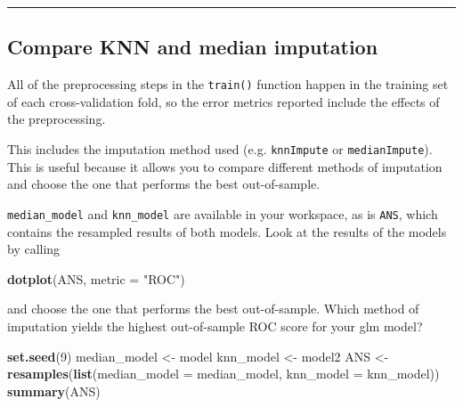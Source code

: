 \documentclass[]{book}
\newenvironment{Shaded}{\begin{snugshade}}{\end{snugshade}}
\newcommand{\KeywordTok}[1]{\textcolor[rgb]{0.13,0.29,0.53}{\textbf{#1}}}
\newcommand{\DataTypeTok}[1]{\textcolor[rgb]{0.13,0.29,0.53}{#1}}
\newcommand{\DecValTok}[1]{\textcolor[rgb]{0.00,0.00,0.81}{#1}}
\newcommand{\StringTok}[1]{\textcolor[rgb]{0.31,0.60,0.02}{#1}}
\newcommand{\NormalTok}[1]{#1}
\begin{document}
\begin{center}\rule{0.5\linewidth}{\linethickness}\end{center}

\subsection*{Compare KNN and median
imputation}\label{compare-knn-and-median-imputation}

All of the preprocessing steps in the \texttt{train()} function happen
in the training set of each cross-validation fold, so the error metrics
reported include the effects of the preprocessing.

This includes the imputation method used (e.g. \texttt{knnImpute} or
\texttt{medianImpute}). This is useful because it allows you to compare
different methods of imputation and choose the one that performs the
best out-of-sample.

\texttt{median\_model} and \texttt{knn\_model} are available in your
workspace, as is \texttt{ANS}, which contains the resampled results of
both models. Look at the results of the models by calling

\begin{Shaded}
\begin{Highlighting}[]
\KeywordTok{dotplot}\NormalTok{(ANS, }\DataTypeTok{metric =} \StringTok{"ROC"}\NormalTok{)}
\end{Highlighting}
\end{Shaded}

and choose the one that performs the best out-of-sample. Which method of
imputation yields the highest out-of-sample ROC score for your glm
model?

\begin{Shaded}
\begin{Highlighting}[]
\KeywordTok{set.seed}\NormalTok{(}\DecValTok{9}\NormalTok{)}
\NormalTok{median_model <-}\StringTok{ }\NormalTok{model}
\NormalTok{knn_model <-}\StringTok{ }\NormalTok{model2}
\NormalTok{ANS <-}\StringTok{ }\KeywordTok{resamples}\NormalTok{(}\KeywordTok{list}\NormalTok{(}\DataTypeTok{median_model =}\NormalTok{ median_model, }\DataTypeTok{knn_model =}\NormalTok{ knn_model))}
\KeywordTok{summary}\NormalTok{(ANS)}
\end{Highlighting}
\end{Shaded}
\end{document}
